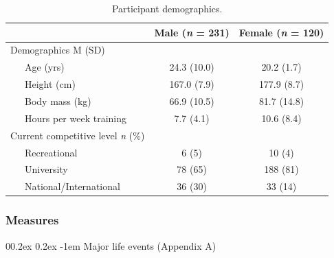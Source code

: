 \documentclass[
  english,
  man,floatsintext]{apa6}
\makeatletter
\renewcommand{\paragraph}{\@startsection{paragraph}{4}{\parindent}%
  {0\baselineskip \@plus 0.2ex \@minus 0.2ex}%
  {-1em}%
  {\normalfont\normalsize\bfseries\itshape\typesectitle}}
\makeatother
\begin{document}
\begin{table}[H]

\begin{center}
\begin{threeparttable}

\caption{\label{tab:parchar}Participant demographics.}

\begin{tabular}{lcc}
\toprule
  & Male (\textit{n} = 231) & Female (\textit{n} = 120)\\
\midrule
Demographics M (SD) &  & \\
\ \ \ Age (yrs) & 24.3 (10.0) & 20.2 (1.7)\\
\ \ \ Height (cm) & 167.0 (7.9) & 177.9 (8.7)\\
\ \ \ Body mass (kg) & 66.9 (10.5) & 81.7 (14.8)\\
\ \ \ Hours per week training & 7.7 (4.1) & 10.6 (8.4)\\ \midrule
Current competitive level \textit{n} (\%) &  & \\
\ \ \ Recreational & 6 (5) & 10 (4)\\
\ \ \ University & 78 (65) & 188 (81)\\
\ \ \ National/International & 36 (30) & 33 (14)\\
\bottomrule
\end{tabular}

\end{threeparttable}
\end{center}

\end{table}

\newpage

\hypertarget{measures-1}{%
\subsubsection{Measures}\label{measures-1}}

\hypertarget{major-life-events-appendix-a-1}{%
\paragraph{Major life events (Appendix A)}\label{major-life-events-appendix-a-1}}
\end{document}
